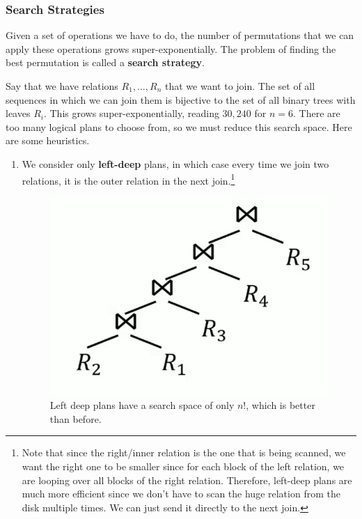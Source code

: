 \documentclass{article}
\begin{document}
    \subsubsection{Search Strategies}  

      Given a set of operations we have to do, the number of permutations that we can apply these operations grows super-exponentially. The problem of finding the best permutation is called a \textbf{search strategy}. 

      \begin{example}
        Say that we have relations $R_1, \ldots, R_n$ that we want to join. The set of all sequences in which we can join them is bijective to the set of all binary trees with leaves $R_i$. This grows super-exponentially, reading $30,240$ for $n = 6$. There are too many logical plans to choose from, so we must reduce this search space. Here are some heuristics. 
        \begin{enumerate}
          \item We consider only \textbf{left-deep} plans, in which case every time we join two relations, it is the outer relation in the next join.\footnote{Note that since the right/inner relation is the one that is being scanned, we want the right one to be smaller since for each block of the left relation, we are looping over all blocks of the right relation. Therefore, left-deep plans are much more efficient since we don't have to scan the huge relation from the disk multiple times. We can just send it directly to the next join.} 

          \begin{figure}[H]
            \centering 
            \includegraphics[scale=0.6]{img/left_deep.png}
            \caption{Left deep plans have a search space of only $n!$, which is better than before. } 
            \label{fig:left_deep}
          \end{figure} 


\end{enumerate}
\end{example}
\end{document}
